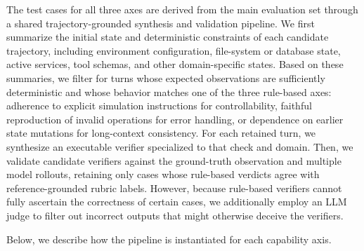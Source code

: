 \documentclass{llmxive}
\begin{document}
The test cases for all three axes are derived from the main evaluation set through a shared trajectory-grounded synthesis and validation pipeline.
We first summarize the initial state and deterministic constraints of each candidate trajectory, including environment configuration, file-system or database state, active services, tool schemas, and other domain-specific states.
Based on these summaries, we filter for turns whose expected observations are sufficiently deterministic and whose behavior matches one of the three rule-based axes: adherence to explicit simulation instructions for controllability, faithful reproduction of invalid operations for error handling, or dependence on earlier state mutations for long-context consistency.
For each retained turn, we synthesize an executable verifier specialized to that check and domain.
Then, we validate candidate verifiers against the ground-truth observation and multiple model rollouts, retaining only cases whose rule-based verdicts agree with reference-grounded rubric labels.
However, because rule-based verifiers cannot fully ascertain the correctness of certain cases, we additionally employ an LLM judge to filter out incorrect outputs that might otherwise deceive the verifiers.

Below, we describe how the pipeline is instantiated for each capability axis.
\end{document}
